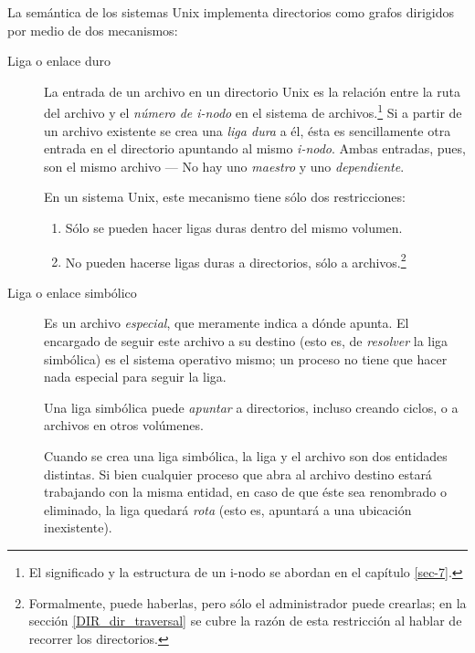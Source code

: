 \documentclass[11pt,fleqn]{book} %
\begin{document}
La semántica de los sistemas Unix implementa directorios como grafos
dirigidos por medio de dos mecanismos:

\begin{description}
\item[Liga o enlace duro] La entrada de un archivo en un directorio Unix es la
               relación entre la ruta del archivo y el \emph{número de                i-nodo} en el sistema de archivos.\footnote{El significado
               y la estructura de un i-nodo se abordan en
               el capítulo \ref{sec-7}. } Si a partir de un archivo
               existente se crea una \emph{liga dura} a él, ésta es
               sencillamente otra entrada en el directorio apuntando
               al mismo \emph{i-nodo}. Ambas entradas, pues, son el mismo
               archivo — No hay uno \emph{maestro} y uno \emph{dependiente}.

	       En un sistema Unix, este mecanismo tiene sólo dos
               restricciones:
\begin{enumerate}
\item Sólo se pueden hacer ligas duras dentro del mismo volumen.
\item No pueden hacerse ligas duras a directorios, sólo a
     archivos.\footnote{Formalmente, puede haberlas, pero sólo el
     administrador puede crearlas; en la sección
     \ref{DIR_dir_traversal} se cubre la razón de esta restricción al
     hablar de recorrer los directorios. }
\end{enumerate}
\item[Liga o enlace simbólico] Es un archivo \emph{especial}, que meramente indica a
                    dónde apunta. El encargado de seguir este archivo
                    a su destino (esto es, de \emph{resolver} la liga
                    simbólica) es el sistema operativo mismo; un
                    proceso no tiene que hacer nada especial para
                    seguir la liga.

		    Una liga simbólica puede \emph{apuntar} a directorios,
                    incluso creando ciclos, o a archivos en otros
		    volúmenes.

		    Cuando se crea una liga simbólica, la liga y el
                    archivo son dos entidades distintas. Si bien
                    cualquier proceso que abra al archivo destino
                    estará trabajando con la misma entidad, en caso de
                    que éste sea renombrado o eliminado, la liga
                    quedará \emph{rota} (esto es, apuntará a una ubicación
                    inexistente).
\end{description}
\end{document}
